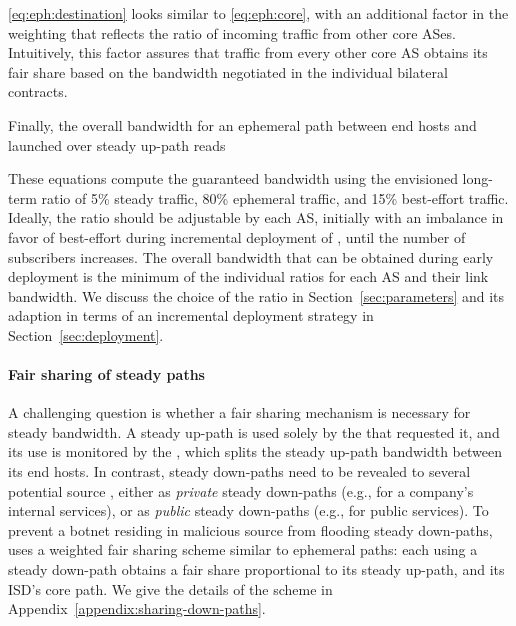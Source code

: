 \autoref{eq:eph:destination} looks similar to
\autoref{eq:eph:core}, with an additional factor in the weighting
that reflects the ratio of incoming traffic from other core ASes.
Intuitively, this factor assures that traffic from every other core
AS obtains its fair share based on the bandwidth negotiated in the
individual bilateral contracts.

Finally, the overall bandwidth for an ephemeral path
between end hosts  and  launched over
steady up-path  reads



These equations compute the guaranteed bandwidth using the envisioned long-term
ratio of 5\% steady traffic, 80\% ephemeral traffic, and 15\% best-effort
traffic. Ideally, the ratio should be adjustable by each AS, initially with an
imbalance in favor of best-effort during incremental deployment of \name, until the
number of \name subscribers increases. The overall bandwidth  that
can be obtained during early deployment is the minimum of the individual ratios
for each AS and their link bandwidth. We discuss the choice of the ratio in
Section~\ref{sec:parameters} and its adaption in terms of an incremental
deployment strategy in Section~\ref{sec:deployment}.

\paragraph{Fair sharing of steady paths} A challenging question is whether a
fair sharing mechanism is necessary for steady bandwidth. A steady up-path is
used solely by the \AD that requested it, and its use is monitored by the \AD,
which splits the steady up-path bandwidth between its end hosts. In contrast,
steady down-paths need to be revealed to several potential source \ADs, either
as \emph{private} steady down-paths (e.g., for a company's internal services),
or as \emph{public} steady down-paths (e.g., for public services). To
prevent a botnet residing in malicious source \ADs from flooding steady
down-paths, \name uses a weighted fair sharing scheme similar to ephemeral
paths: each \AD using a steady down-path obtains a fair share proportional to
its steady up-path, and its ISD's core path. We give the details of the scheme
in Appendix~\ref{appendix:sharing-down-paths}.

